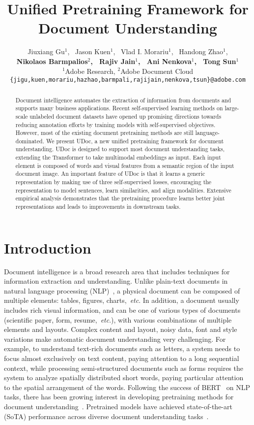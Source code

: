\documentclass{article}
\title{Unified Pretraining Framework for Document Understanding}
\author{{Jiuxiang Gu$^1$, \ Jason Kuen$^1$, \ Vlad I. Morariu$^1$, \ Handong Zhao$^1$},\\
	{\textbf{Nikolaos Barmpalios$^2$, \ Rajiv Jain$^1$, \ Ani Nenkova$^1$, \ Tong Sun$^1$}}\\
	$^1$Adobe Research, $^2$Adobe Document Cloud\\
	\texttt{\{jigu,kuen,morariu,hazhao,barmpali,rajijain,nenkova,tsun\}@adobe.com}
}
\def\etc{\emph{etc}}
\begin{document}
\maketitle
\begin{abstract}
	Document intelligence automates the extraction of information from documents and supports many business applications. Recent self-supervised learning methods on large-scale unlabeled document datasets have opened up promising directions towards reducing annotation efforts by training models with self-supervised objectives. However, most of the existing document pretraining methods are still language-dominated. We present UDoc, a new unified pretraining framework for document understanding. UDoc is designed to support most document understanding tasks, extending the Transformer to take multimodal embeddings as input. Each input element is composed of words and visual features from a semantic region of the input document image. An important feature of UDoc is that it learns a generic representation by making use of three self-supervised losses, encouraging the representation to model sentences, learn similarities, and align modalities. Extensive empirical analysis demonstrates that the pretraining procedure learns better joint representations and leads to improvements in downstream tasks.
\end{abstract}
	
	\section{Introduction}
	Document intelligence is a broad research area that includes techniques for information extraction and understanding. Unlike plain-text documents in natural language processing (NLP)~\cite{yang2016hierarchical,goldstein2000multi}, a physical document can be composed of multiple elements: {tables, figures, charts},~\etc. In addition, a document usually includes rich visual information, and can be one of various types of documents (scientific paper, form, resume,~\etc.), with various combinations of multiple elements and layouts.
	Complex content and layout, noisy data, font and style variations make automatic document understanding very challenging. For example, {to understand text-rich} documents such as letters, a system needs to focus almost exclusively on text content, paying attention to a long sequential context, while processing semi-structured documents such as forms requires the system to analyze spatially distributed short words, paying particular attention to the spatial arrangement of the words. Following the success of BERT~\cite{dai2019transformer} on NLP tasks, there has been growing interest in developing {pretraining} methods for document understanding~\cite{xu2020layoutlm,xu2020layoutlmv2,selfdoc2021}. {Pretrained} models have achieved state-of-the-art (SoTA) performance across diverse document understanding tasks~\cite{park2019cord,harley2015icdar}.
	
\end{document}
